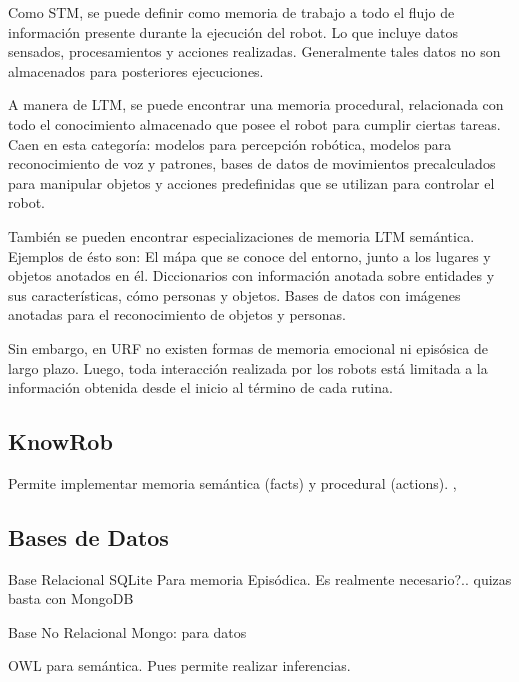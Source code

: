 Como STM, se puede definir como memoria de trabajo a todo el flujo de informaci\'on presente durante la ejecuci\'on del robot. Lo que incluye datos sensados, procesamientos y acciones realizadas. Generalmente tales datos no son almacenados para posteriores ejecuciones.

A manera de LTM, se puede encontrar una memoria procedural, relacionada con todo el conocimiento almacenado que posee el robot para cumplir ciertas tareas. Caen en esta categor\'ia: modelos para percepci\'on rob\'otica, modelos para reconocimiento de voz y patrones, bases de datos de movimientos precalculados para manipular objetos y acciones predefinidas que se utilizan para controlar el robot.

Tambi\'en se pueden encontrar especializaciones de memoria LTM sem\'antica. Ejemplos de \'esto son: El m\'apa que se conoce del entorno, junto a los lugares y objetos anotados en \'el. Diccionarios con informaci\'on anotada sobre entidades y sus caracter\'isticas, c\'omo personas y objetos. Bases de datos con im\'agenes anotadas para el reconocimiento de objetos y personas. 

Sin embargo, en URF no existen formas de memoria emocional ni epis\'osica de largo plazo. Luego, toda interacci\'on realizada por los robots est\'a limitada a la informaci\'on obtenida desde el inicio al t\'ermino de cada rutina.



\subsection{KnowRob}

Permite implementar memoria sem\'antica (facts) y procedural (actions).
\cite{Tenorth2013}, \cite{Tenorth2009}

%
%

\subsection{Bases de Datos}

Base Relacional SQLite Para memoria Epis\'odica. Es realmente necesario?.. quizas basta con MongoDB

Base No Relacional Mongo: para datos

OWL para sem\'antica. Pues permite realizar inferencias.


